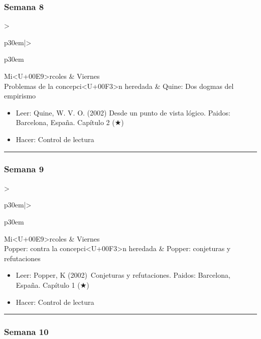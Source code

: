 \documentclass[spanish,]{article}
\begin{document}
\subsubsection{Semana 8}\label{semana-8}

\begin{tabular}{>{\raggedright\arraybackslash}p{30em}|>{\raggedright\arraybackslash}p{30em}}
\hline
Mi<U+00E9>rcoles & Viernes\\
\hline
Problemas de la concepci<U+00F3>n heredada & Quine: Dos dogmas del empirismo\\
\hline
\end{tabular}

\begin{itemize}
\item
  Leer: Quine, W. V. O. (2002) Desde un punto de vista lógico. Paidos:
  Barcelona, España. Capítulo 2 (★)
\item
  Hacer: Control de lectura
\end{itemize}

\begin{center}\rule{0.5\linewidth}{\linethickness}\end{center}

\subsubsection{Semana 9}\label{semana-9}

\begin{tabular}{>{\raggedright\arraybackslash}p{30em}|>{\raggedright\arraybackslash}p{30em}}
\hline
Mi<U+00E9>rcoles & Viernes\\
\hline
Popper: contra la concepci<U+00F3>n heredada & Popper: conjeturas y refutaciones\\
\hline
\end{tabular}

\begin{itemize}
\item
  Leer: Popper, K (2002)~Conjeturas y refutaciones. Paidos: Barcelona,
  España. Capítulo 1 (★)
\item
  Hacer: Control de lectura
\end{itemize}

\begin{center}\rule{0.5\linewidth}{\linethickness}\end{center}

\subsubsection{Semana 10}\label{semana-10}
\end{document}
